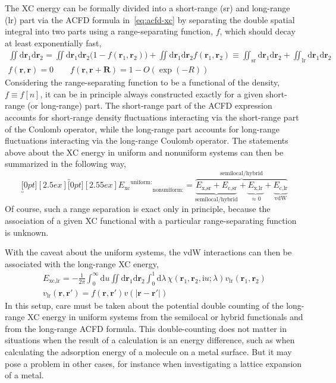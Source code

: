 The XC energy can be formally divided into a short-range (sr) and long-range (lr) part via the ACFD formula in~\eqref{eq:acfd-xc} by separating the double spatial integral into two parts using a range-separating function, $f$, which should decay at least exponentially fast,
\begin{equation}
\begin{gathered}
  \iint\mathrm d\mathbf r_1\mathrm d\mathbf r_2=\iint\mathrm d\mathbf r_1\mathrm d\mathbf r_2\big(1-f(\mathbf r_1,\mathbf r_2)\!\big)+\iint\mathrm d\mathbf r_1\mathrm d\mathbf r_2f(\mathbf r_1,\mathbf r_2)\equiv\iint_\text{sr}\mathrm d\mathbf r_1\mathrm d\mathbf r_2+\iint_\text{lr}\mathrm d\mathbf r_1\mathrm d\mathbf r_2 \\
  f(\mathbf r,\mathbf r)=0\qquad f(\mathbf r,\mathbf r+\mathbf R)=1-O(\exp(-R))
\end{gathered}
\end{equation}
Considering the range-separating function to be a functional of the density, $f\equiv f[n]$, it can be in principle always constructed exactly for a given short-range (or long-range) part.
The short-range part of the ACFD expression accounts for short-range density fluctuations interacting via the short-range part of the Coulomb operator, while the long-range part accounts for long-range fluctuations interacting via the long-range Coulomb operator.
The statements above about the XC energy in uniform and nonuniform systems can then be summarized in the following way,
\begin{equation}
  \underbracket[0pt][2.5ex]{\overbracket[0pt][2.55ex]{E_\text{xc}}^\text{uniform:}}_\text{nonuniform:}=\overbrace{\underbrace{E_\text{x,sr}+E_\text{c,sr}}_\text{semilocal/hybrid}+\underbrace{E_\text{x,lr}}_{\approx 0}+\underbrace{E_\text{c,lr}}_\text{vdW}}^\text{semilocal/hybrid}
\end{equation}
Of course, such a range separation is exact only in principle, because the association of a given XC functional with a particular range-separating function is unknown.

With the caveat about the uniform systems, the vdW interactions can then be associated with the long-range XC energy,
\begin{equation}
\begin{gathered}
  E_\text{xc,lr}=-\frac1{2\pi}\int_0^\infty\mathrm du\iint\mathrm d\mathbf r_1\mathrm d\mathbf r_2\int_0^1\mathrm d\lambda\,\chi(\mathbf r_1,\mathbf r_2,\mathrm iu;\lambda)v_\text{lr}(\mathbf r_1,\mathbf r_2) \\
  v_\text{lr}(\mathbf r,\mathbf r')=f(\mathbf r,\mathbf r')v(|\mathbf r-\mathbf r'|)
\end{gathered}
\label{eq:range-separation}
\end{equation}
In this setup, care must be taken about the potential double counting of the long-range XC energy in uniform systems from the semilocal or hybrid functionals and from the long-range ACFD formula.
This double-counting does not matter in situations when the result of a calculation is an energy difference, such as when calculating the adsorption energy of a molecule on a metal surface.
But it may pose a problem in other cases, for instance when investigating a lattice expansion of a metal.

